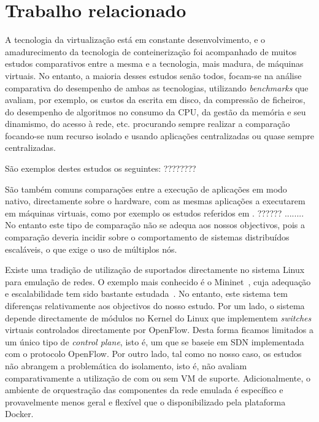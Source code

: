 
\section{Trabalho relacionado}
\label{relacionado}

A tecnologia da virtualização está em constante desenvolvimento, e o amadurecimento da tecnologia de conteinerização
foi acompanhado de muitos estudos comparativos entre a mesma e a tecnologia, mais madura, de máquinas virtuais.
No entanto, a maioria desses estudos senão todos, focam-se na análise comparativa do desempenho de ambas as tecnologias,
utilizando \textit{benchmarks} que avaliam, por exemplo, os custos da escrita em disco, 
da compressão de ficheiros, do desempenho de algoritmos no consumo da CPU, da gestão da memória e
seu dinamismo, do acesso à rede, etc.  procurando sempre realizar a comparação focando-se num recurso isolado e usando aplicações
centralizadas ou quase sempre centralizadas.

São exemplos destes estudos os seguintes: ????????

São também comuns comparações entre a execução de aplicações em modo nativo, directamente sobre o
hardware, com as mesmas aplicações a executarem em máquinas virtuais, como por exemplo os estudos referidos em  \cite{7095802}. ??????
........ No entanto este tipo de comparação não se adequa aos nossos objectivos, pois a comparação deveria
incidir sobre o comportamento de sistemas distribuídos escaláveis, o que exige o uso de múltiplos nós.

Existe uma tradição de utilização de {\conts} suportados directamente no sistema Linux para emulação de
redes. O exemplo mais conhecido é o Mininet~\cite{Lantz:2010:NLR:1868447.1868466}, cuja adequação e escalabilidade tem sido bastante
estudada~\cite{Handigol:2012:RNE:2413176.2413206}. No entanto, este sistema tem diferenças 
relativamente aos objectivos do nosso estudo. Por um lado, o sistema depende directamente de módulos
no Kernel do Linux que implementem \emph{switches} virtuais controlados directamente por OpenFlow.
Desta forma ficamos limitados a um único tipo de \emph{control plane}, isto é, um que se baseie em
SDN implementada com o protocolo OpenFlow. Por outro lado, tal como no nosso caso, os
estudos não abrangem a problemática do isolamento, isto é, não avaliam comparativamente
a utilização de {\conts} com ou sem VM de suporte. Adicionalmente, o ambiente de orquestração das
componentes da rede emulada é específico e provavelmente menos geral e flexível que o disponibilizado pela
plataforma Docker.






